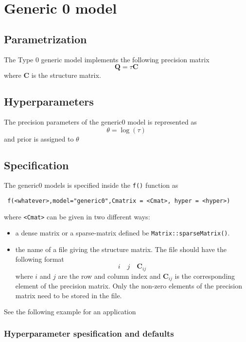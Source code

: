 \documentclass[a4paper,11pt]{article}
\begin{document}
\section*{Generic 0 model}

\subsection*{Parametrization}

The Type 0 generic model implements the following precision matrix
\begin{displaymath}
    \mathbf{Q}=\tau\mathbf{C}
\end{displaymath}
where $\mathbf{C}$ is the structure matrix.

\subsection*{Hyperparameters}

The precision parameters of the generic0 model is represented as
\begin{displaymath}
    \theta = \log(\tau)
\end{displaymath}
and prior is assigned to $\theta$

\subsection*{Specification}

The generic0 models is specified inside the {\tt f()} function as
\begin{verbatim}
 f(<whatever>,model="generic0",Cmatrix = <Cmat>, hyper = <hyper>)
\end{verbatim}


where {\tt <Cmat>} can be given in two different ways:
\begin{itemize}
\item a dense matrix or a sparse-matrix defined be
    \texttt{Matrix::sparseMatrix()}.
\item the name of a file giving the structure matrix. The file should
    have the following format
    \[
    i\quad j\quad \mathbf{C}_{ij}
    \]
    where $i$ and $j$ are the row and column index and
    $\mathbf{C}_{ij}$ is the corresponding element of the precision
    matrix. Only the non-zero elements of the precision matrix need to
    be stored in the file.  
\end{itemize}
See the following example for an application

\subsubsection*{Hyperparameter spesification and defaults}

\end{document}
